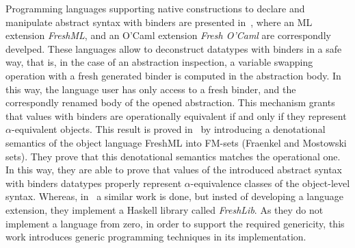 \documentclass{book}
\newcommand{\alp}{\ensuremath{\alpha}}
\begin{document}
Programming languages supporting native constructions to declare and manipulate abstract syntax with binders are presented in~\cite{ShinwellPG03,SHINWELL200653}, where an ML extension \emph{FreshML}, and an O'Caml extension \emph{Fresh O'Caml} are correspondly develped. These languages allow to deconstruct datatypes with binders in a safe way, that is, in the case of an abstraction inspection, a variable swapping operation with a fresh generated binder is computed in the abstraction body. In this way, the language user has only access to a fresh binder, and the correspondly renamed body of the opened abstraction. This mechanism grants that values with binders are operationally equivalent if and only if they represent \alp-equivalent objects. This result is proved in~\cite{ShinwellPG03} by introducing a denotational semantics of the object language FreshML into FM-sets (Fraenkel and Mostowski sets). They prove that this denotational semantics matches the operational one. In this way, they are able to prove that values of the introduced abstract syntax with binders datatypes properly represent \alp-equivalence classes of the object-level syntax. Whereas, in~\cite{Cheney} a similar work is done, but insted of developing a language extension, they implement a Haskell library called \emph{FreshLib}. As they do not implement a language from zero, in order to support the required genericity, this work introduces generic programming techniques in its implementation.
\end{document}
